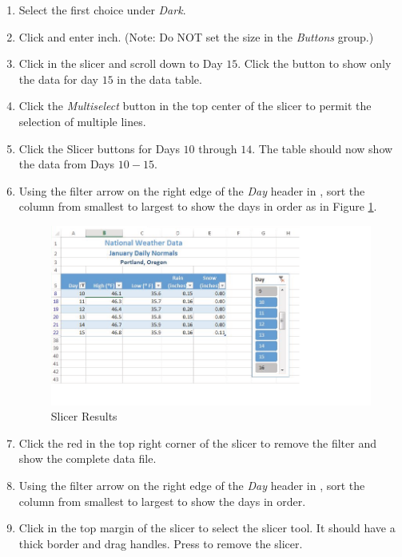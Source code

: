 \begin{enumbox}
	\begin{enumerate}
		\item Select the first choice under \textit{Dark}.
		\item Click  and enter  inch. (Note: Do NOT set the size in the \textit{Buttons} group.)
		\item Click in the slicer and scroll down to Day $ 15 $. Click the  button to show only the data for day $ 15 $ in the data table.
		\item Click the \textit{Multiselect} button in the top center of the slicer to permit the selection of multiple lines.
		\item Click the Slicer buttons for Days $ 10 $ through $ 14 $. The table should now show the data from Days $ 10-15 $.
		\item Using the filter arrow on the right edge of the \textit{Day} header in , sort the column from smallest to largest to show the days in order as in Figure \ref{05:fig21}.

		\begin{figure}[H]
			\centering
			\includegraphics[width=\maxwidth{.95\linewidth}]{gfx/ch05_fig21}
			\caption{Slicer Results}
			\label{05:fig21}
		\end{figure}

		\item Click the red  in the top right corner of the slicer to remove the filter and show the complete data file.
		\item Using the filter arrow on the right edge of the \textit{Day} header in , sort the column from smallest to largest to show the days in order.
		\item Click in the top margin of the slicer to select the slicer tool. It should have a thick border and drag handles. Press  to remove the slicer.
	\end{enumerate}
\end{enumbox}

